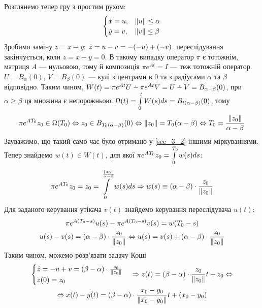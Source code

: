 \begin{example}
    Розглянемо тепер гру з простим рухом:
    \begin{gather*}
        \begin{cases}
            \dot{x} = u, & \left\Vert u \right\Vert \leq \alpha \\
            \dot{y} = v, & \left\Vert v \right\Vert \leq \beta 
        \end{cases}
    \end{gather*}
    Зробимо заміну $z = x - y$: $\dot{z} = u - v = -(-u) + (-v)$.
    переслідування закінчується, коли $z = x - y = 0$.
    В такому випадку оператор $\pi$ є тотожнім, матриця $A$ --- нульовою,
    тому й композиція $\pi e^{At} = I$ --- теж тотожній оператор.
    $U = B_{\alpha}(0)$, $V = B_{\beta}(0)$ --- кулі з центрами в $0$ та з радіусами
    $\alpha$ та $\beta$ відповідно. Таким чином, $W(t) = 
    \pi e^{At} U \setdif \pi e^{A t} V = U \setdif V = B_{\alpha - \beta}(0)$,
    при $\alpha \geq \beta$ ця множина є непорожньою.
    $\Omega(t) = \int\limits_0^t W(s)ds = B_{t(\alpha - \beta)}(0)$, тому
    \begin{gather*}
        \pi e^{AT_0} z_0 \in \Omega(T_0) \Leftrightarrow z_0 \in B_{T_0(\alpha - \beta)}(0) \Leftrightarrow
        \left\Vert z_0 \right\Vert = T_0(\alpha - \beta) \Leftrightarrow T_0 = \frac{\left\Vert z_0 \right\Vert}{\alpha - \beta}
    \end{gather*}
    Зауважимо, що такий само час було отримано у \ref{sec_3_2} іншими міркуваннями.
    Тепер знайдемо $w(t) \in W(t)$, для якої $\pi e^{A T_0} z_0 = \int\limits_0^{T_0} w(s)ds$:
    \begin{gather*}
        \pi e^{A T_0} z_0 = z_0 = \int\limits_0^{\frac{\left\Vert z_0 \right\Vert}{\alpha - \beta}} w(s) ds \Rightarrow
        w(s) \equiv (\alpha - \beta)\cdot \frac{z_0}{\left\Vert z_0 \right\Vert}
    \end{gather*}
    Для заданого керування утікача $v(t)$ знайдемо керування переслідувача $u(t)$:
    \begin{gather*}
        \pi e^{A (T_0-s)} u(s) - \pi e^{A (T_0-s)} v(s) = w(T_0 - s) \\
        u(s) - v(s) = (\alpha - \beta)\cdot \frac{z_0}{\left\Vert z_0 \right\Vert} \Leftrightarrow
        u(s) = v(s) + (\alpha - \beta)\cdot \frac{z_0}{\left\Vert z_0 \right\Vert}
    \end{gather*}
    Таким чином, можемо розв'язати задачу Коші
    \begin{gather*}
        \begin{cases}
            \dot{z} = -u + v = (\beta - \alpha)\cdot \frac{z_0}{\left\Vert z_0 \right\Vert} \\
            z(0) = z_0
        \end{cases} \Rightarrow
        z(t) = (\beta - \alpha)\cdot \frac{z_0}{\left\Vert z_0 \right\Vert} t + z_0 \Leftrightarrow \\ \Leftrightarrow
        x(t) - y(t) = (\beta - \alpha)\cdot \frac{x_0 - y_0}{\left\Vert x_0 - y_0 \right\Vert} t + (x_0 - y_0)
    \end{gather*}
\end{example}

